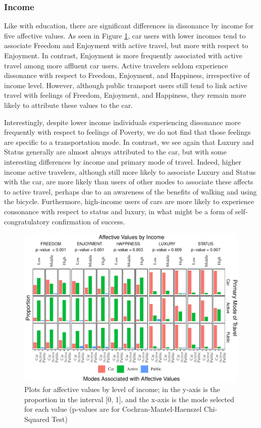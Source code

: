 \documentclass[]{elsarticle} %
\makeatletter
\def\maxwidth{\ifdim\Gin@nat@width>\linewidth\linewidth
\else\Gin@nat@width\fi}
\let\Oldincludegraphics\includegraphics
\renewcommand{\includegraphics}[1]{\Oldincludegraphics[width=\maxwidth]{#1}}
\makeatother
\begin{document}
\hypertarget{income-1}{%
\subsubsection{Income}\label{income-1}}

Like with education, there are significant differences in dissonance by
income for five affective values. As seen in Figure
\ref{fig:bar-plots-by-income}, car users with lower incomes tend to
associate Freedom and Enjoyment with active travel, but more with
respect to Enjoyment. In contrast, Enjoyment is more frequently
associated with active travel among more affluent car users. Active
travelers seldom experience dissonance with respect to Freedom,
Enjoyment, and Happiness, irrespective of income level. However,
although public transport users still tend to link active travel with
feelings of Freedom, Enjoyment, and Happiness, they remain more likely
to attribute these values to the car.

Interestingly, despite lower income individuals experiencing dissonance
more frequently with respect to feelings of Poverty, we do not find that
those feelings are specific to a transportation mode. In contrast, we
see again that Luxury and Status generally are almost always attributed
to the car, but with some interesting differences by income and primary
mode of travel. Indeed, higher income active travelers, although still
more likely to associate Luxury and Status with the car, are more likely
than users of other modes to associate these affects to active travel,
perhaps due to an awareness of the benefits of walking and using the
bicycle. Furthermore, high-income users of cars are more likely to
experience consonance with respect to status and luxury, in what might
be a form of self-congratulatory confirmation of success.

\begin{figure}
\centering
\includegraphics{Dissonance_Santiago_v2_files/figure-latex/figure-bar-plots-by-attribute-and-income-1.pdf}
\caption{\label{fig:bar-plots-by-income}Plots for affective values by
level of income; in the y-axis is the proportion in the interval {[}0,
1{]}, and the x-axis is the mode selected for each value (p-values are
for Cochran-Mantel-Haenszel Chi-Squared Test)}
\end{figure}
\end{document}
